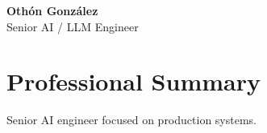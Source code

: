 \documentclass[10pt]{article}
\begin{document}
\begin{center}
    {\LARGE\textbf{Oth\'on Gonz\'alez}}\\[3pt]
    {\large Senior AI / LLM Engineer}\\[5pt]
\end{center}
\section*{Professional Summary}
Senior AI engineer focused on production systems.
\end{document}

